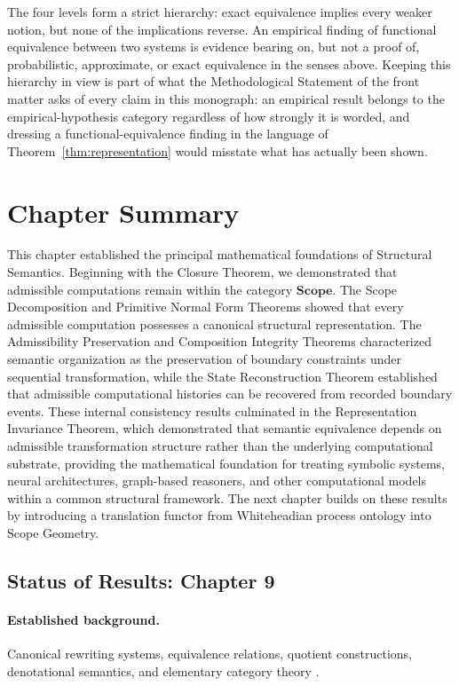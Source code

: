 \documentclass[11pt,twoside,openright]{book}
\numberwithin{equation}{chapter}
\theoremstyle{definition}
\theoremstyle{plain}
\theoremstyle{remark}
\theoremstyle{definition}
\newcommand{\CatScope}{\mathbf{Scope}}
\begin{document}
The four levels form a strict hierarchy: exact equivalence implies every
weaker notion, but none of the implications reverse. An empirical finding
of functional equivalence between two systems is evidence bearing on,
but not a proof of, probabilistic, approximate, or exact equivalence in
the senses above. Keeping this hierarchy in view is part of what the
Methodological Statement of the front matter asks of every claim in this
monograph: an empirical result belongs to the empirical-hypothesis
category regardless of how strongly it is worded, and dressing a
functional-equivalence finding in the language of Theorem~\ref{thm:representation}
would misstate what has actually been shown.

\section{Chapter Summary}

This chapter established the principal mathematical foundations of
Structural Semantics. Beginning with the Closure Theorem, we demonstrated
that admissible computations remain within the category $\CatScope$. The
Scope Decomposition and Primitive Normal Form Theorems showed that every
admissible computation possesses a canonical structural representation.
The Admissibility Preservation and Composition Integrity Theorems
characterized semantic organization as the preservation of boundary
constraints under sequential transformation, while the State
Reconstruction Theorem established that admissible computational
histories can be recovered from recorded boundary events. These internal
consistency results culminated in the Representation Invariance Theorem,
which demonstrated that semantic equivalence depends on admissible
transformation structure rather than the underlying computational
substrate, providing the mathematical foundation for treating symbolic
systems, neural architectures, graph-based reasoners, and other
computational models within a common structural framework. The next
chapter builds on these results by introducing a translation functor from
Whiteheadian process ontology into Scope Geometry.

\subsection*{Status of Results: Chapter 9}

\paragraph{Established background.} Canonical rewriting systems,
equivalence relations, quotient constructions, denotational semantics,
and elementary category theory
\cite{Scott1970,Winskel1993,MacLane1998,Awodey2010}.
\end{document}
